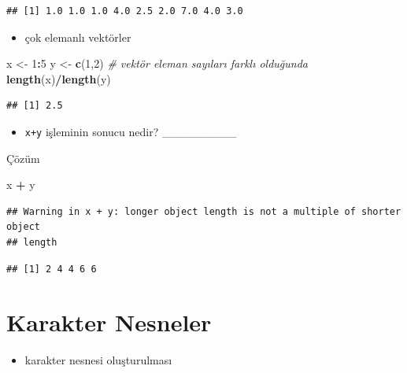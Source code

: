 \documentclass[
  oneside]{book}
\newenvironment{Shaded}{\begin{snugshade}}{\end{snugshade}}
\newcommand{\CommentTok}[1]{\textcolor[rgb]{0.56,0.35,0.01}{\textit{#1}}}
\newcommand{\DecValTok}[1]{\textcolor[rgb]{0.00,0.00,0.81}{#1}}
\newcommand{\FunctionTok}[1]{\textcolor[rgb]{0.13,0.29,0.53}{\textbf{#1}}}
\newcommand{\NormalTok}[1]{#1}
\newcommand{\OtherTok}[1]{\textcolor[rgb]{0.56,0.35,0.01}{#1}}
\newcommand{\SpecialCharTok}[1]{\textcolor[rgb]{0.81,0.36,0.00}{\textbf{#1}}}
\providecommand{\tightlist}{%
  \setlength{\itemsep}{0pt}\setlength{\parskip}{0pt}}
\begin{document}
\begin{verbatim}
## [1] 1.0 1.0 1.0 4.0 2.5 2.0 7.0 4.0 3.0
\end{verbatim}

\begin{itemize}
\tightlist
\item
  çok elemanlı vektörler
\end{itemize}

\begin{Shaded}
\begin{Highlighting}[]
\NormalTok{x }\OtherTok{\textless{}{-}} \DecValTok{1}\SpecialCharTok{:}\DecValTok{5}
\NormalTok{y }\OtherTok{\textless{}{-}} \FunctionTok{c}\NormalTok{(}\DecValTok{1}\NormalTok{,}\DecValTok{2}\NormalTok{)}
\CommentTok{\# vektör eleman sayıları farklı olduğunda}
\FunctionTok{length}\NormalTok{(x)}\SpecialCharTok{/}\FunctionTok{length}\NormalTok{(y)}
\end{Highlighting}
\end{Shaded}

\begin{verbatim}
## [1] 2.5
\end{verbatim}

\begin{itemize}
\tightlist
\item
  \texttt{x+y} işleminin sonucu nedir? \_\_\_\_\_\_\_\_\_
\end{itemize}

Çözüm

\begin{Shaded}
\begin{Highlighting}[]
\NormalTok{x }\SpecialCharTok{+}\NormalTok{ y}
\end{Highlighting}
\end{Shaded}

\begin{verbatim}
## Warning in x + y: longer object length is not a multiple of shorter object
## length
\end{verbatim}

\begin{verbatim}
## [1] 2 4 4 6 6
\end{verbatim}

\hypertarget{karakter-nesneler}{%
\section{Karakter Nesneler}\label{karakter-nesneler}}

\begin{itemize}
\tightlist
\item
  karakter nesnesi oluşturulması
\end{itemize}
\end{document}
